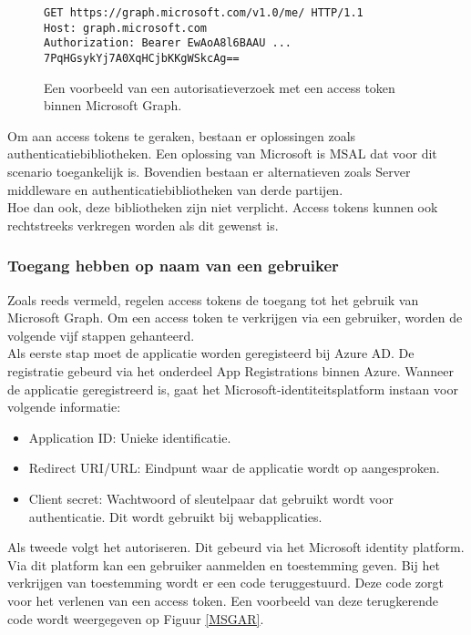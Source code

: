 \begin{figure}[h]
    \footnotesize\begin{verbatim}GET https://graph.microsoft.com/v1.0/me/ HTTP/1.1
Host: graph.microsoft.com
Authorization: Bearer EwAoA8l6BAAU ... 7PqHGsykYj7A0XqHCjbKKgWSkcAg==
    \end{verbatim}    
    \caption[Voorbeeld Microsoft Graph Autorisatieverzoek]{Een voorbeeld van een autorisatieverzoek met een access token binnen Microsoft Graph.}
    \label{MSGA}
\end{figure}

Om aan access tokens te geraken, bestaan er oplossingen zoals authenticatiebibliotheken. Een oplossing van Microsoft is \ac{MSAL} dat voor dit scenario toegankelijk is. Bovendien bestaan er alternatieven zoals Server middleware en authenticatiebibliotheken van derde partijen. \\

Hoe dan ook, deze bibliotheken zijn niet verplicht. Access tokens kunnen ook rechtstreeks verkregen worden als dit gewenst is. 

\subsubsection{Toegang hebben op naam van een gebruiker}

Zoals reeds vermeld, regelen access tokens de toegang tot het gebruik van Microsoft Graph. Om een access token te verkrijgen via een gebruiker, worden de volgende vijf stappen gehanteerd. \\

Als eerste stap moet de applicatie worden geregisteerd bij Azure \ac{AD}. De registratie gebeurd via het onderdeel App Registrations binnen Azure. Wanneer de applicatie geregistreerd is, gaat het Microsoft-identiteitsplatform instaan voor volgende informatie: 

\begin{itemize}
    \item Application ID: Unieke identificatie.
    \item Redirect URI/URL: Eindpunt waar de applicatie wordt op aangesproken.
    \item Client secret: Wachtwoord of sleutelpaar dat gebruikt wordt voor authenticatie. Dit wordt gebruikt bij webapplicaties.
\end{itemize}

Als tweede volgt het autoriseren. Dit gebeurd via het Microsoft identity platform. Via dit platform kan een gebruiker aanmelden en toestemming geven. Bij het verkrijgen van toestemming wordt er een code teruggestuurd. Deze code zorgt voor het verlenen van een access token. Een voorbeeld van deze terugkerende code wordt weergegeven op Figuur \ref{MSGAR}. \\

